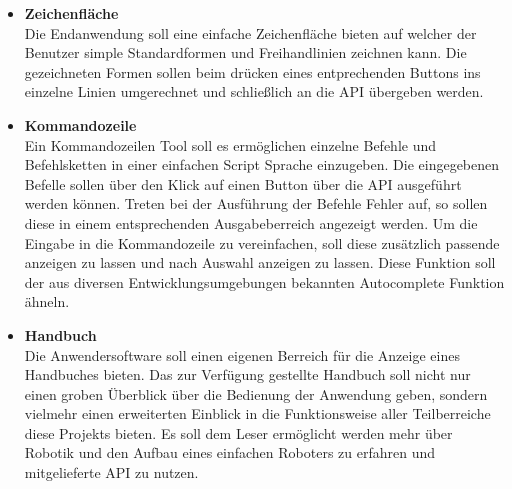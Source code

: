 \begin{itemize}
\item \textbf{Zeichenfläche}\\
Die Endanwendung soll eine einfache Zeichenfläche bieten auf welcher der Benutzer simple Standardformen und Freihandlinien zeichnen kann. Die gezeichneten Formen sollen beim drücken eines entprechenden Buttons ins einzelne Linien umgerechnet und schließlich an die API übergeben werden.
\item \textbf{Kommandozeile}\\
Ein Kommandozeilen Tool soll es ermöglichen einzelne Befehle und Befehlsketten in einer einfachen Script Sprache einzugeben. Die eingegebenen Befelle sollen über den Klick auf einen Button über die API ausgeführt werden können. Treten bei der Ausführung der Befehle Fehler auf, so sollen diese in einem entsprechenden Ausgabeberreich angezeigt werden.
Um die Eingabe in die Kommandozeile zu vereinfachen, soll diese zusätzlich passende anzeigen zu lassen und nach Auswahl anzeigen zu lassen. Diese Funktion soll der aus diversen Entwicklungsumgebungen bekannten Autocomplete Funktion ähneln.
\item \textbf{Handbuch}\\
Die Anwendersoftware soll einen eigenen Berreich für die Anzeige eines Handbuches bieten. Das zur Verfügung gestellte Handbuch soll nicht nur einen groben Überblick über die Bedienung der Anwendung geben, sondern vielmehr einen erweiterten Einblick in die Funktionsweise aller Teilberreiche diese Projekts bieten. Es soll dem Leser ermöglicht werden mehr über Robotik und den Aufbau eines einfachen Roboters zu erfahren und mitgelieferte API zu nutzen.
\end{itemize}
